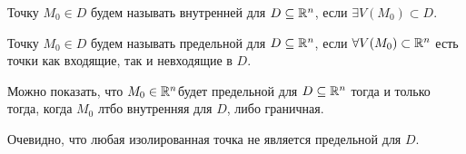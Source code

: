 \documentclass[../main.tex]{subfiles}
\begin{document}
	Точку $M_0 \in D$ будем называть внутренней для $D \subseteq \mathbb{R}^n$, если $\exists V(M_0) \subset D$.
	
	Точку $M_0 \in D$ будем называть предельной для $D \subseteq \mathbb{R}^n$, если $\forall V(M_0) \subset \mathbb{R}^n$ есть точки как входящие, так и невходящие в $D$.
	
	Можно показать, что $M_0 \in \mathbb{R}^n$будет предельной для $D \subseteq \mathbb{R}^n$ тогда и только тогда, когда $M_0$ лтбо внутренняя для $D$, либо граничная.
	
	Очевидно, что любая изолированная точка не является предельной для $D$.
% 
% 
\end{document}
